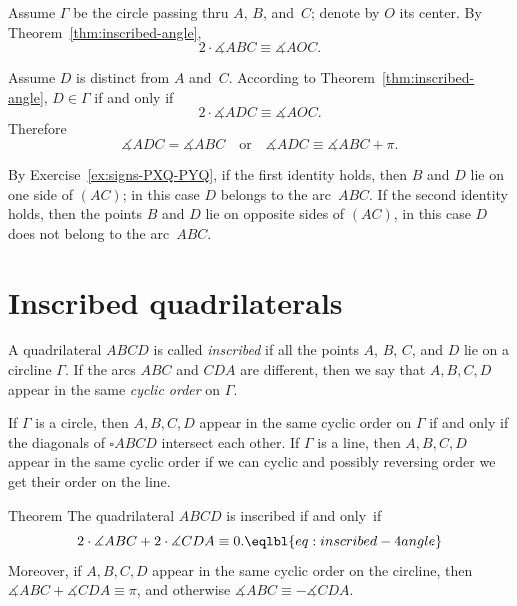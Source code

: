 Assume $\Gamma$ be the circle passing thru $A$, $B$, and~$C$;
denote by $O$ its center.
By Theorem~\ref{thm:inscribed-angle},
\[2\cdot \measuredangle ABC\equiv \measuredangle AOC.\]

Assume $D$ is distinct from $A$ and~$C$.
According to Theorem~\ref{thm:inscribed-angle},
$D\in\Gamma$ if and only if 
\[2\cdot \measuredangle ADC\equiv \measuredangle AOC.\]
Therefore
$$\measuredangle ADC
= \measuredangle ABC
\quad
\text{or}
\quad
\measuredangle ADC
\equiv
\measuredangle ABC+\pi.$$


By Exercise~\ref{ex:signs-PXQ-PYQ},
if the first identity holds, 
then $B$ and $D$ lie on one side of $(AC)$;
in this case $D$ belongs to the arc~$ABC$.
If the second identity holds, 
then the points $B$ and $D$ lie on opposite sides of $(AC)$,
in this case $D$ does not belong to the arc~$ABC$.
\qeds
















\section*{Inscribed quadrilaterals}

A quadrilateral $ABCD$ is called 
\emph{inscribed}
if all the points $A$, $B$, $C$, and $D$ lie on a circline $\Gamma$.
If the arcs $ABC$ and $CDA$ are different, then we say that $A,B,C,D$ appear in the same \emph{cyclic order} on $\Gamma$.

If $\Gamma$ is a circle, then $A,B,C,D$ appear in the same cyclic order on $\Gamma$ if and only if the diagonals of $\square ABCD$ intersect each other.
If $\Gamma$ is a line, then $A,B,C,D$ appear in the same cyclic order if we can cyclic and possibly reversing order we get their order on the line.

\begin{thm}{Theorem}\label{thm:inscribed-quadrilateral}
The quadrilateral $ABCD$ is inscribed 
if and only~if
$$2\cdot\measuredangle ABC+2\cdot\measuredangle CDA\equiv 0.
\eqlbl{eq:inscribed-4angle}$$
Moreover, if $A,B,C,D$ appear in the same cyclic order on the circline, then 
$\measuredangle ABC+\measuredangle CDA
\equiv 
\pi$, and otherwise 
$\measuredangle ABC
\equiv
-\measuredangle CDA$.

\end{thm}


